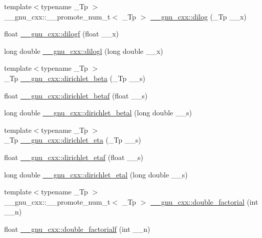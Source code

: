 \begin{DoxyCompactItemize}
\item 
{\footnotesize template$<$typename \+\_\+\+Tp $>$ }\\\+\_\+\+\_\+gnu\+\_\+cxx\+::\+\_\+\+\_\+promote\+\_\+num\+\_\+t$<$ \+\_\+\+Tp $>$ \hyperlink{group__gnu__math__spec__func_ga8fceba3ecc618971e0e3c089d8dc49cf}{\+\_\+\+\_\+gnu\+\_\+cxx\+::dilog} (\+\_\+\+Tp \+\_\+\+\_\+x)
\item 
float \hyperlink{group__gnu__math__spec__func_ga901091e0e7ce7d6113ae6a86f4865a92}{\+\_\+\+\_\+gnu\+\_\+cxx\+::dilogf} (float \+\_\+\+\_\+x)
\item 
long double \hyperlink{group__gnu__math__spec__func_gae90c13ee690ebaf10a18a900fe2646f9}{\+\_\+\+\_\+gnu\+\_\+cxx\+::dilogl} (long double \+\_\+\+\_\+x)
\item 
{\footnotesize template$<$typename \+\_\+\+Tp $>$ }\\\+\_\+\+Tp \hyperlink{group__gnu__math__spec__func_ga87466a2d429a2815d794acc21c882b08}{\+\_\+\+\_\+gnu\+\_\+cxx\+::dirichlet\+\_\+beta} (\+\_\+\+Tp \+\_\+\+\_\+s)
\item 
float \hyperlink{group__gnu__math__spec__func_ga9bb40e20b18e3eb822e70af955940830}{\+\_\+\+\_\+gnu\+\_\+cxx\+::dirichlet\+\_\+betaf} (float \+\_\+\+\_\+s)
\item 
long double \hyperlink{group__gnu__math__spec__func_gaed6fd85a4577f4de66d74742a1850a13}{\+\_\+\+\_\+gnu\+\_\+cxx\+::dirichlet\+\_\+betal} (long double \+\_\+\+\_\+s)
\item 
{\footnotesize template$<$typename \+\_\+\+Tp $>$ }\\\+\_\+\+Tp \hyperlink{group__gnu__math__spec__func_gae46e26e4107675d285c79a2d6202e6c7}{\+\_\+\+\_\+gnu\+\_\+cxx\+::dirichlet\+\_\+eta} (\+\_\+\+Tp \+\_\+\+\_\+s)
\item 
float \hyperlink{group__gnu__math__spec__func_ga6f05d076600b1de9193e586cf89547c9}{\+\_\+\+\_\+gnu\+\_\+cxx\+::dirichlet\+\_\+etaf} (float \+\_\+\+\_\+s)
\item 
long double \hyperlink{group__gnu__math__spec__func_ga408e2267b648f29445522dbafb7a0e1a}{\+\_\+\+\_\+gnu\+\_\+cxx\+::dirichlet\+\_\+etal} (long double \+\_\+\+\_\+s)
\item 
{\footnotesize template$<$typename \+\_\+\+Tp $>$ }\\\+\_\+\+\_\+gnu\+\_\+cxx\+::\+\_\+\+\_\+promote\+\_\+num\+\_\+t$<$ \+\_\+\+Tp $>$ \hyperlink{group__gnu__math__spec__func_ga206cdf1ae7f9a0df3048af18892b8ba8}{\+\_\+\+\_\+gnu\+\_\+cxx\+::double\+\_\+factorial} (int \+\_\+\+\_\+n)
\item 
float \hyperlink{group__gnu__math__spec__func_ga85ec284e603f32d18970bbdbb12d5150}{\+\_\+\+\_\+gnu\+\_\+cxx\+::double\+\_\+factorialf} (int \+\_\+\+\_\+n)

\end{DoxyCompactItemize}
